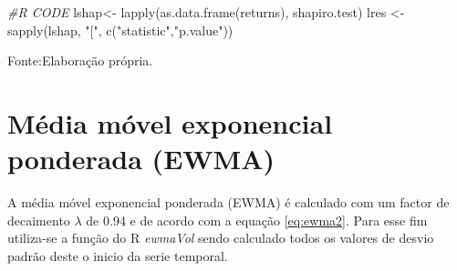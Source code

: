 \documentclass[
  12pt,
  a4paper,
  openany]{book}
\newenvironment{Shaded}{\begin{snugshade}}{\end{snugshade}}
\newcommand{\CommentTok}[1]{\textcolor[rgb]{0.56,0.35,0.01}{\textit{#1}}}
\newcommand{\FunctionTok}[1]{\textcolor[rgb]{0.00,0.00,0.00}{#1}}
\newcommand{\NormalTok}[1]{#1}
\newcommand{\OtherTok}[1]{\textcolor[rgb]{0.56,0.35,0.01}{#1}}
\newcommand{\StringTok}[1]{\textcolor[rgb]{0.31,0.60,0.02}{#1}}
\theoremstyle{definition}
\theoremstyle{definition}
\theoremstyle{definition}
\theoremstyle{remark}
\begin{document}
\scriptsize

\begin{Shaded}
\begin{Highlighting}[]
\CommentTok{\#R CODE}
\NormalTok{lshap}\OtherTok{\textless{}{-}} \FunctionTok{lapply}\NormalTok{(}\FunctionTok{as.data.frame}\NormalTok{(returns), shapiro.test)}
\NormalTok{lres }\OtherTok{\textless{}{-}} \FunctionTok{sapply}\NormalTok{(lshap, }\StringTok{"["}\NormalTok{, }\FunctionTok{c}\NormalTok{(}\StringTok{"statistic"}\NormalTok{,}\StringTok{"p.value"}\NormalTok{))}
\end{Highlighting}
\end{Shaded}

\normalsize

\begin{table}[!h]

\caption{\label{tab:shapiro}Teste normalidade Shapiro-Wilk}
\centering
{}
\end{table}
\FloatBarrier
\centering

Fonte:Elaboração própria.

\justifying
\bigskip

\hypertarget{muxe9dia-muxf3vel-exponencial-ponderada-ewma-1}{%
\section{Média móvel exponencial ponderada (EWMA)}\label{muxe9dia-muxf3vel-exponencial-ponderada-ewma-1}}

A média móvel exponencial ponderada (EWMA) é calculado com um factor de decaimento \(\lambda\) de 0.94 e de acordo com a equação \eqref{eq:ewma2}. Para esse fim utiliza-se a função do R \emph{ewmaVol} sendo calculado todos os valores de desvio padrão deste o inicio da serie temporal.

\scriptsize
\end{document}
